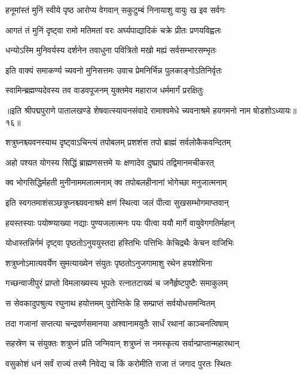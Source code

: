 \twolineshloka
{हनूमांस्तं मुनिं स्वीये पृष्ठ आरोप्य वेगवान्}
{सकुटुम्बं निनायाशु वायुः ख इव सर्वगः}%

\twolineshloka
{आगतं तं मुनिं दृष्ट्वा रामो मतिमतां वरः}
{अर्घ्यपाद्यादिकं चक्रे प्रीतः प्रणयविह्वलः}%

\twolineshloka
{धन्योऽस्मि मुनिवर्यस्य दर्शनेन तवाधुना}
{पवित्रितो मखो मह्यं सर्वसम्भारसम्भृतः}%

\twolineshloka
{इति वाक्यं समाकर्ण्य च्यवनो मुनिसत्तमः}
{उवाच प्रेमनिर्भिन्न पुलकाङ्गोऽतिनिर्वृतः}%

\twolineshloka
{स्वामिन्ब्रह्मण्यदेवस्य तव वाडवपूजनम्}
{युक्तमेव महाराज धर्ममार्गं प्ररक्षितुः}%

॥इति श्रीपद्मपुराणे पातालखण्डे शेषवात्स्यायनसंवादे रामाश्वमेधे च्यवनाश्रमे हयगमनो नाम षोडशोऽध्यायः॥१६॥



\twolineshloka
{शत्रुघ्नश्च्यवनस्याथ दृष्ट्वाऽचिन्त्यं तपोबलम्}
{प्रशशंस तपो ब्राह्मं सर्वलोकैकवन्दितम्}%

\twolineshloka
{अहो पश्यत योगस्य सिद्धिं ब्राह्मणसत्तमे}
{यः क्षणादेव दुष्प्रापं तद्विमानमचीकरत्}%

\twolineshloka
{क्व भोगसिद्धिर्महती मुनीनाममलात्मनाम्}
{क्व तपोबलहीनानां भोगेच्छा मनुजात्मनाम्}%

\twolineshloka
{इति स्वगतमाशंसञ्छत्रुघ्नश्च्यवनाश्रमे}
{क्षणं स्थित्वा जलं पीत्वा सुखसम्भोगमाप्तवान्}%

\twolineshloka
{हयस्तस्याः पयोष्ण्याख्या नद्याः पुण्यजलात्मनः}
{पयः पीत्वा ययौ मार्गे वायुवेगगतिर्महान्}%

\twolineshloka
{योधास्तन्निर्गमं दृष्ट्वा पृष्ठतोऽनुययुस्तदा}
{हस्तिभिः पत्तिभिः केचिद्रथैः केचन वाजिभिः}%

\twolineshloka
{शत्रुघ्नोऽमात्यवर्येण सुमत्याख्येन संयुतः}
{पृष्ठतोऽनुजगामाशु रथेन हयशोभिना}%

\twolineshloka
{गच्छन्वाजीपुरं प्राप्तो विमलाख्यस्य भूपतेः}
{रत्नातटाख्यं च जनैर्हृष्टपुष्टैः समाकुलम्}%

\twolineshloka
{स सेवकादुपश्रुत्य रघुनाथ हयोत्तमम्}
{पुरोन्तिके हि सम्प्राप्तं सर्वयोधसमन्वितम्}%

\twolineshloka
{तदा गजानां सप्तत्या चन्द्रवर्णसमानया}
{अश्वानामयुतैः सार्धं रथानां काञ्चनत्विषाम्}%

\twolineshloka
{सहस्रेण च संयुक्तः शत्रुघ्नं प्रति जग्मिवान्}
{शत्रुघ्नं स नमस्कृत्य सर्वान्प्राप्तान्महारथान्}%

\twolineshloka
{वसुकोशं धनं सर्वं राज्यं तस्मै निवेद्य च}
{किं करोमीति राजा तं जगाद पुरतः स्थितः}%

